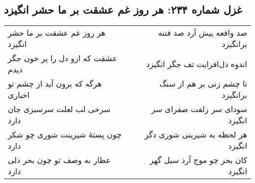 \begin{center}
\section*{غزل شماره ۲۳۴: هر روز غم عشقت بر ما حشر انگیزد}
\label{sec:234}
\begin{longtable}{l p{0.5cm} r}
هر روز غم عشقت بر ما حشر انگیزد
&&
صد واقعه پیش آرد صد فتنه برانگیزد
\\
عشقت که ازو دل را پر خون جگر دیدم
&&
اندوه دل‌افزایت تف جگر انگیزد
\\
هرگه که برون آید از چشم تو اخباری
&&
تا چشم زنی بر هم از سنگ برانگیزد
\\
سرخی لب لعلت سرسبزی جان دارد
&&
سودای سر زلفت صفرای سر انگیزد
\\
چون پستهٔ شیرینت شوری چو شکر دارد
&&
هر لحظه به شیرینی شوری دگر انگیزد
\\
عطار به وصف تو چون بحر دلی دارد
&&
کان بحر چو موج آرد سیل گهر انگیزد
\\
\end{longtable}
\end{center}
